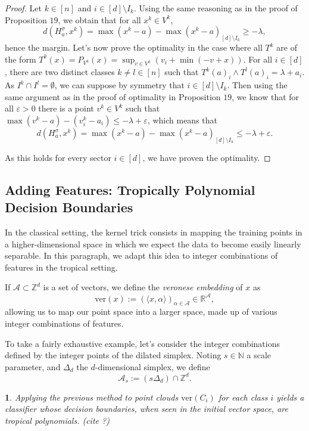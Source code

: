 \documentclass[oneside,english,a4paper]{amsart}
\numberwithin{equation}{section}
\numberwithin{figure}{section}
\theoremstyle{plain}
\theoremstyle{definition}
\theoremstyle{plain}
\newtheorem{prop}[thm]{\protect\propositionname}
\theoremstyle{remark}
\theoremstyle{plain}
\theoremstyle{definition}
\theoremstyle{definition}
\providecommand{\propositionname}{Proposition}
\begin{document}
\begin{proof}
Let $k\in[n]$ and $i\in[d]\setminus I_{k}$. Using the same reasoning
as in the proof of Proposition $19$, we obtain that for all $x^{k}\in V^{k}$,
\[
d(H_{a}^{\sigma},x^{k})=\max(x^{k}-a)-\max(x^{k}-a)_{[d]\setminus I_{k}}\ge-\lambda,
\]
hence the margin. Let's now prove the optimality in the case where
all $T^{k}$ are of the form $T^{k}(x)=P_{V^{k}}(x)=\sup_{v\in V^{k}}\left(v_{i}+\min(-v+x)\right).$
For all $i\in[d]$, there are two distinct classes $k\ne l\in[n]$
such that $T^{k}(a)_{i}\wedge T^{l}(a)_{i}=\lambda+a_{i}$. As $I^{k}\cap I^{l}=\emptyset$,
we can suppose by symmetry that $i\in[d]\setminus I_{k}.$ Then using
the same argument as in the proof of optimality in Proposition $19$,
we know that for all $\varepsilon>0$ there is a point $v^{k}\in V^{k}$
such that $\max(v^{k}-a)-(v_{i}^{k}-a_{i})\le-\lambda+\varepsilon$,
which means that 
\[
d(H_{a}^{\sigma},x^{k})=\max(x^{k}-a)-\max(x^{k}-a)_{[d]\setminus I_{k}}\le-\lambda+\varepsilon.
\]

As this holds for every sector $i\in[d]$, we have proven the optimality. 
\end{proof}

\subsection{Adding Features: Tropically Polynomial Decision Boundaries}

In the classical setting, the kernel trick consists in mapping the
training points in a higher-dimensional space in which we expect the
data to become easily linearly separable. In this paragraph, we adapt
this idea to integer combinations of features in the tropical setting.

If $\mathcal{A}\subset\mathbb{Z}^{d}$ is a set of vectors, we define
the \emph{veronese embedding} of $x$ as 
\[
\text{ver}(x):=\left(\langle x,\alpha\rangle\right)_{\alpha\in\mathcal{A}}\in\mathbb{R}^{\mathcal{A}},
\]
allowing us to map our point space into a larger space, made up of
various integer combinations of features. 

To take a fairly exhaustive example, let's consider the integer combinations defined by the integer points of the dilated simplex. Noting $s\in\mathbb{N}$ a scale parameter, and $\Delta_{d}$ the $d$-dimensional simplex, we define 
\[
\mathcal{A}_{s}:=(s\Delta_{d})\cap\mathbb{Z}^{d}.
\]

\begin{prop}
Applying the previous method to point clouds $\text{ver}(C_{i})$
for each class $i$ yields a classifier whose decision boundaries,
when seen in the initial vector space, are tropical polynomials. (cite
?)
\end{prop}
\end{document}
